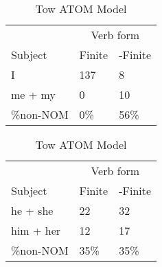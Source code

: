 \begin{table}[]
\caption{Tow ATOM Model}
\begin{minipage}{0.5\textwidth}
    \centering
    \begin{tabular}{@{}lll@{}}
        \toprule
         & \multicolumn{2}{c}{Verb form}\\
         \cline{2-3}
        Subject & Finite & -Finite \\
        \midrule
        I & 137 & 8 \\
        me + my & 0 & 10 \\
        \hline
        \%non-NOM & 0\% & 56\% \\
        \bottomrule
    \end{tabular}
\end{minipage}
\begin{minipage}{0.5\textwidth}
    \centering
    \begin{tabular}{@{}lll@{}}
        \toprule
         & \multicolumn{2}{c}{Verb form}\\
         \cline{2-3}
        Subject & Finite & -Finite \\
        \midrule
        he + she & 22 & 32 \\
        him + her & 12 & 17 \\
        \hline
        \%non-NOM & 35\% & 35\% \\
        \bottomrule
    \end{tabular}
    \end{minipage}


\end{table}
